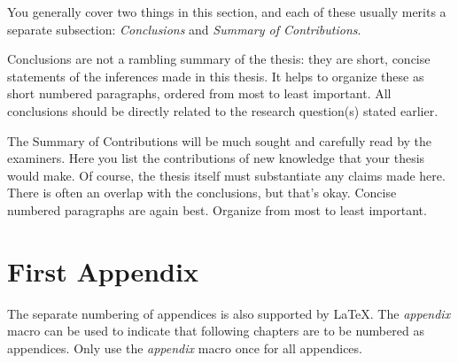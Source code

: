 \documentclass[12pt,a4paper,oneside]{book} %
\begin{document}
You generally cover two things in this section, and each of these usually merits
a separate subsection: \textit{Conclusions} and \textit{Summary of
Contributions}.

Conclusions are not a rambling summary of the thesis: they are short, concise
statements of the inferences made in this thesis. It helps to organize these as
short numbered paragraphs, ordered from most to least important. All conclusions
should be directly related to the research question(s) stated earlier.

The Summary of Contributions will be much sought and carefully read by the
examiners. Here you list the contributions of new knowledge that your thesis
would make. Of course, the thesis itself must substantiate any claims made here.
There is often an overlap with the conclusions, but that's okay. Concise numbered
paragraphs are again best. Organize from most to least important.


\appendix
\chapter{First Appendix}
The separate numbering of appendices is also supported by LaTeX. The \textit{appendix} macro can be used to indicate that following chapters are to be numbered as appendices. Only use the \textit{appendix} macro once for all appendices.




\end{document}
